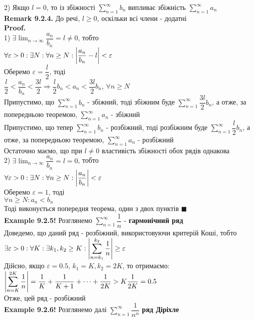 \documentclass[a4paper, 14pt]{extarticle}
\def\huge{\displaystyle}
\def\bigline{\vspace{5mm}\\}
\def\ex#1{\textbf{Example {#1}}}
\def\rm#1{\textbf{Remark {#1}}}
\def\proof{\textbf{Proof.}\\}
\def\bigline{\vspace{5mm}\\}
\def\qed{$\blacksquare$}
\begin{document}
2) Якщо $l = 0$, то із збіжності $\huge \sum_{n=1}^{\infty} b_n$ випливає збіжність $\huge \sum_{n=1}^{\infty} a_n$
\bigline
\rm{9.2.4.} До речі, $l \geq 0$, оскільки всі члени - додатні\\
\proof
1) $\exists \huge \lim_{n \to \infty} \dfrac{a_n}{b_n} = l \neq 0$, тобто\\
$\forall \varepsilon > 0: \exists N: \forall n \geq N: \abs{\dfrac{a_n}{b_n}-l} < \varepsilon$\\
Оберемо $\varepsilon = \dfrac{l}{2}$, тоді\\
$\dfrac{l}{2} < \dfrac{a_n}{b_n} < \dfrac{3l}{2} \Rightarrow \dfrac{l}{2}b_n < a_n < \dfrac{3l}{2} b_n$, $\forall n \geq N$\\
Припустимо, що $\huge \sum_{n=1}^{\infty} b_n$ - збіжний, тоді збіжним буде $\huge \sum_{n=1}^{\infty} \dfrac{3l}{2} b_n$, а отже, за попередньою теоремою, $\huge \sum_{n=1}^{\infty} a_n$ - збіжний\\
Припустимо, що тепер $\huge \sum_{n=1}^{\infty} b_n$ - розбіжний, тоді розбіжним буде $\huge \sum_{n=1}^{\infty} \dfrac{l}{2}b_n$, а отже, за попередньою теоремою, $\huge \sum_{n=1}^{\infty} a_n$ - розбіжний\\
Остаточно маємо, що при $l \neq 0$ властивість збіжності обох рядів однакова
\bigline
2) $\exists \huge \lim_{n \to \infty} \dfrac{a_n}{b_n} = l = 0$, тобто\\
$\forall \varepsilon > 0: \exists N: \forall n \geq N: \abs{\dfrac{a_n}{b_n}} < \varepsilon$\\
Оберемо $\varepsilon = 1$, тоді\\
$\forall n \geq N: a_n < b_n$\\
Тоді виконується попередня теорема, один з двох пунктів \qed
\bigline
\ex{9.2.5!} Розглянемо $\huge \sum_{n=1}^{\infty} \dfrac{1}{n}$ - \textbf{гармонічний ряд}\\
Доведемо, що даний ряд - розбіжний, використовуючи критерій Коші, тобто\\
$\exists \varepsilon > 0: \forall K: \exists k_1,k_2 \geq K: \huge \abs{\sum_{n=k_1}^{k_2} \dfrac{1}{n}} \geq \varepsilon$\\
Дійсно, якщо $\varepsilon = 0.5$, $k_1 = K, k_2 = 2K$, то отримаємо:\\
$\huge \abs{\sum_{n=K}^{2K} \dfrac{1}{n}} = \dfrac{1}{K} + \dfrac{1}{K+1} + \dots + \dfrac{1}{2K} > K \dfrac{1}{2K} = 0.5$\\
Отже, цей ряд - розбіжний
\bigline
\ex{9.2.6!} Розглянемо далі $\huge \sum_{n=1}^{\infty} \dfrac{1}{n^\alpha}$ \textbf{ряд Діріхле} \\
\end{document}
